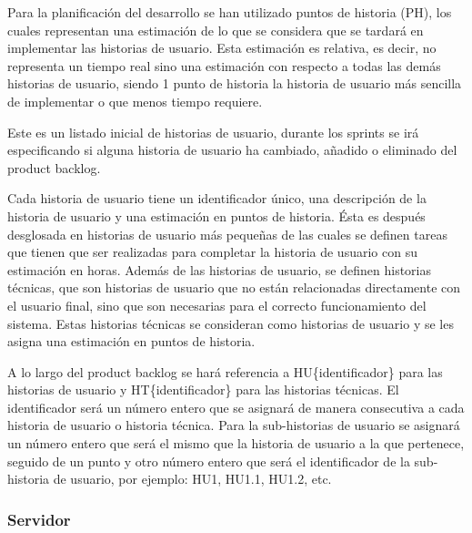 Para la planificación del desarrollo se han utilizado puntos de historia (PH), los cuales representan una estimación de lo que se considera que se tardará en implementar las historias de usuario. Esta estimación es relativa, es decir, no representa un tiempo real sino una estimación con respecto a todas las demás historias de usuario, siendo 1 punto de historia la historia de usuario más sencilla de implementar o que menos tiempo requiere.

Este es un listado inicial de historias de usuario, durante los sprints se irá especificando si alguna historia de usuario ha cambiado, añadido o eliminado del product backlog.

Cada historia de usuario tiene un identificador único, una descripción de la historia de usuario y una estimación en puntos de historia. Ésta es después desglosada en historias de usuario más pequeñas de las cuales se definen tareas que tienen que ser realizadas para completar la historia de usuario con su estimación en horas.
Además de las historias de usuario, se definen historias técnicas, que son historias de usuario que no están relacionadas directamente con el usuario final, sino que son necesarias para el correcto funcionamiento del sistema. Estas historias técnicas se consideran como historias de usuario y se les asigna una estimación en puntos de historia.

A lo largo del product backlog  se hará referencia a HU\{identificador\} para las historias de usuario y HT\{identificador\} para las historias técnicas. El identificador será un número entero que se asignará de manera consecutiva a cada historia de usuario o historia técnica. Para la sub-historias de usuario se asignará un número entero que será el mismo que la historia de usuario a la que pertenece, seguido de un punto y otro número entero que será el identificador de la sub-historia de usuario, por ejemplo: HU1, HU1.1, HU1.2, etc.

\newpage
\subsubsection{Servidor}
\renewcommand{\arraystretch}{1.3} %

